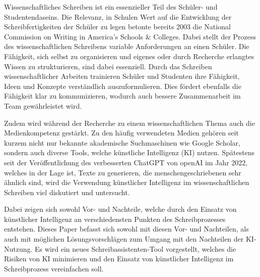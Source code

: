 \documentclass[../main.tex]{subfiles}
\begin{document}
Wissenschaftliches Schreiben ist ein essenzieller Teil des Schüler- und Studentendaseins. 
Die Relevanz, in Schulen Wert auf die Entwicklung der Schreibfertigkeiten der Schüler zu legen betonte bereits 2003 
die National Commission on Writing in America’s Schools \& Colleges. Dabei stellt der Prozess des 
wissenschaftlichen Schreibens variable Anforderungen an einen Schüler. Die Fähigkeit, sich selbst zu organisieren und 
eigenes oder durch Recherche erlangtes Wissen zu strukturieren, sind dabei essenziell. Durch das Schreiben 
wissenschaftlicher Arbeiten trainieren Schüler und Studenten ihre Fähigkeit, Ideen und Konzepte verständlich 
auszuformulieren. Dies fördert ebenfalls die Fähigkeit klar zu kommunizieren, wodurch auch bessere Zusammenarbeit 
im Team gewährleistet wird.  

Zudem wird während der Recherche zu einem wissenschaftlichen Thema auch die Medienkompetenz gestärkt. Zu den häufig 
verwendeten Medien gehören seit kurzem nicht nur bekannte akademische Suchmaschinen wie Google Scholar, sondern auch 
diverse Tools, welche künstliche Intelligenz (KI) nutzen. Spätestens seit der Veröffentlichung des verbesserten ChatGPT von openAI im Jahr 2022, welches in der 
Lage ist, Texte zu generieren, die menschengeschriebenen sehr ähnlich sind, wird die Verwendung künstlicher Intelligenz 
im wissenschaftlichen Schreiben viel diskutiert und untersucht.\cite{humanWritingToAi}

Dabei zeigen sich sowohl Vor- und Nachteile, welche durch den Einsatz von künstlicher Intelligenz an 
verschiedensten Punkten des Schreibprozesses entstehen. 
Dieses Paper befasst sich sowohl mit diesen Vor- und Nachteilen, als auch mit möglichen
Lösungsvorschlägen zum Umgang mit den Nachteilen der KI-Nutzung. Es wird ein neues Schreibassistenten-Tool vorgestellt, welches die Risiken 
von KI minimieren und den Einsatz von künstlicher Intelligenz im Schreibprozess vereinfachen soll.
\end{document}
